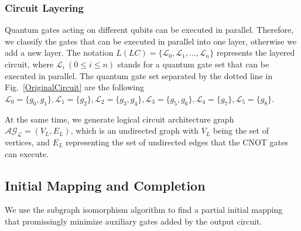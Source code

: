 \documentclass[runningheads]{llncs}
\begin{document}
\subsubsection{Circuit Layering}
Quantum gates acting on different qubits can be executed in parallel. Therefore, we classify the gates that can be executed in parallel into one layer, otherwise we add a new layer. The notation $L(LC)=\{\mathcal{L}_{0},\mathcal{L}_{1},...,\mathcal{L}_{n}\}$ represents the layered circuit, where $\mathcal{L}_{i} \ (0 \le i \le n) $ stands for a quantum gate set that can be executed in parallel. The quantum gate set separated by the dotted line in Fig.~\ref{OriginalCircuit} are the following $\mathcal{L}_{0}=\{g_{0},g_{1}\},\mathcal{L}_{1}=\{g_{2}\},
 \mathcal{L}_{2}=\{g_{3},g_{4}\},\mathcal{L}_{3}=\{g_{5},g_{6}\},\mathcal{L}_{4}=\{g_{7}\},\mathcal{L}_{5}=\{g_{8}\}$.

At the same time, we generate logical circuit architecture graph $\mathcal{AG_{L}}=(V_{L},E_{L})$, which is an undirected graph with $V_{L}$ being the set of vertices, and $E_{L}$ representing the set of undirected edges that the CNOT gates can execute.

\subsection{Initial Mapping and Completion}
We use the subgraph isomorphism algorithm to find a partial initial mapping that promissingly minimize auxiliary gates added by the output circuit.
\end{document}
